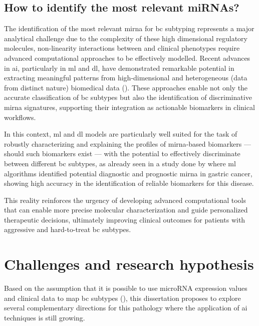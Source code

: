 \subsection{How to identify the most relevant miRNAs?}

The identification of the most relevant \gls{mirna} for \gls{bc} subtyping
represents a major analytical challenge due to the complexity of these high
dimensional regulatory molecules, non-linearity interactions between and
clinical phenotypes require advanced computational approaches to be effectively
modelled. Recent advances in \gls{ai}, particularly in \gls{ml} and \gls{dl},
have demonstrated remarkable potential in extracting meaningful patterns from
high-dimensional and heterogeneous (data from distinct nature) biomedical data
(\textcite{ml_for_microRNA_Luo2023MachineLearning}). These approaches enable not
only the accurate classification of \gls{bc} subtypes but also the
identification of discriminative \gls{mirna} signatures, supporting their
integration as actionable biomarkers in clinical workflows.

In this context, \gls{ml} and \gls{dl} models are particularly well suited for
the task of robustly characterizing and explaining the profiles of
\gls{mirna}-based biomarkers — should such biomarkers exist — with the
potential to effectively discriminate between different \gls{bc} subtypes, as
already seen in a study done by \textcite{ml_gastric_Azari2023} where
\gls{ml} algorithms identified potential diagnostic and prognostic
\gls{mirna} in gastric cancer, showing high accuracy in the
identification of reliable biomarkers for this disease.

This reality reinforces the urgency of developing advanced computational tools
that can enable more precise molecular characterization and guide personalized
therapeutic decisions, ultimately improving clinical outcomes for patients with
aggressive and hard-to-treat \gls{bc} subtypes.

\section{Challenges and research hypothesis}
\label{sec:challenges+research-hypothesis}
Based on the assumption that it is possible to use microRNA expression values
and clinical data to map \gls{bc} subtypes
(\textcites{mirna_as_biomarkers_Ho2022}{mirnas_in_bc_Muñoz2023}), this dissertation
proposes to explore several complementary directions for this pathology where
the application of \gls{ai} techniques is still growing.

